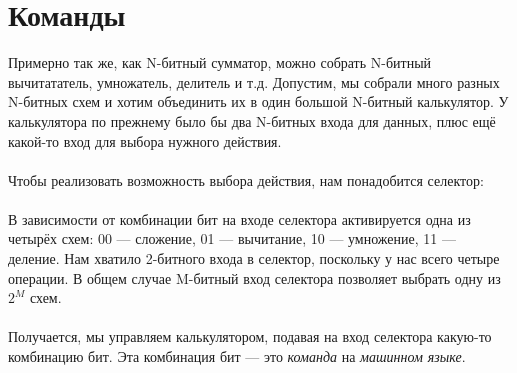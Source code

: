 \documentclass[11pt]{book}
\begin{document}
\section{Команды}
Примерно так же, как N-битный сумматор, можно собрать N-битный вычитататель, умножатель, делитель и т.д.
Допустим, мы собрали много разных N-битных схем и хотим объединить их в один большой N-битный калькулятор.
У калькулятора по прежнему было бы два N-битных входа для данных, плюс ещё какой-то вход для выбора нужного действия.
\\ \\
Чтобы реализовать возможность выбора действия, нам понадобится селектор:
\\
\\
В зависимости от комбинации бит на входе селектора активируется одна из четырёх схем:
00 --- сложение, 01 --- вычитание, 10 --- умножение, 11 --- деление.
Нам хватило 2-битного входа в селектор, поскольку у нас всего четыре операции.
В общем случае M-битный вход селектора позволяет выбрать одну из $2^M$ схем.
\\ \\
Получается, мы управляем калькулятором, подавая на вход селектора какую-то комбинацию бит.
Эта комбинация бит --- это \emph{команда} на \emph{машинном языке}.
\end{document}
